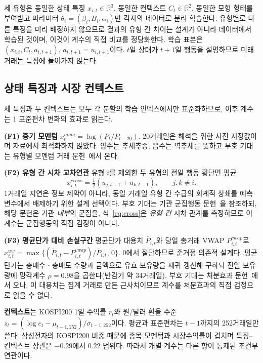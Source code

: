 세 유형은 동일한 상태 특징 $x_{i,t}\in\mathbb{R}^{3}$, 동일한 컨텍스트
$C_t\in\mathbb{R}^{2}$, 동일한 모형 형태를 부여받고 파라미터
$\theta_i=(\beta_i,B_i,\alpha_i)$만 각자의 데이터로 분리 학습한다. 유형별로 다른 특징을
미리 배정하지 않으므로 결과의 유형 간 차이는 설계가 아니라 데이터에서 학습된 것이며,
이것이 계수의 직접 비교를 정당화한다. 학습 표본은 $(x_{i,t},C_t,a_{i,t+1})$,
$a_{i,t+1}=u_{i,t+1}$이다. $t$일 상태가 $t+1$일 행동을 설명하므로 미래 거래는 특징에
들어가지 않는다.

\subsection{상태 특징과 시장 컨텍스트}
\label{sec:features}

세 특징과 두 컨텍스트는 모두 각 분할의 학습 인덱스에서만 표준화하므로, 이후 계수는 1
표준편차 변화의 효과로 읽는다.

\textbf{(F1) 중기 모멘텀} $x^{mom}_{t}=\log(P_t/P_{t-20})$. 20거래일은 해석을 위한 사전
지정값이며 자료에서 최적화하지 않았다. 양수는 추세추종, 음수는 역추세를 뜻하고 부호
기대는 유형별 모멘텀 거래
문헌~\cite{grinblatt2000investment,choe1999foreign}에서 온다.

\textbf{(F2) 유형 간 시차 교차연관} 유형 $i$를 제외한 두 유형의 전일 행동 횡단면 평균
\begin{equation}
x^{cross}_{i,t}=\tfrac{1}{2}\left(u_{j,t-1}+u_{k,t-1}\right),\qquad j,k\neq i.
\label{eq:cross}
\end{equation}
1거래일 지연은 정보 제약이 아니라, 동일 거래일 유형 간 수급의 회계적 상쇄를 예측
변수에서 배제하기 위한 설계 선택이다. 부호 기대는 기관 군집행동
문헌~\cite{lakonishok1992impact}을 참조하되, 해당 문헌은 기관 \emph{내부}의 군집을,
식~\eqref{eq:cross}은 \emph{유형 간} 시차 관계를 측정하므로 이 계수는 군집행동의 직접
검정이 아니다.

\textbf{(F3) 평균단가 대비 손실구간} 평균단가 대용치 $\bar P_{i,t}$와 당일 총거래 VWAP
$P^{vwap}_{i,t}$로 $x^{uw}_{i,t}=\max\{(\bar P_{i,t}-P^{vwap}_{i,t})/\bar P_{i,t},\,0\}$.
0에서 절단하므로 준거점 의존적 설계다. 평균단가는 총매수ㆍ총매도 수량과 금액으로 유효
보유량을 재귀 갱신해 구하되 전일 보유량에 망각계수 $\rho=0.98$을 곱한다(반감기 약
34거래일). 부호 기대는 처분효과
문헌~\cite{shefrin1985disposition,odean1998investors}에서 오나, 이 대용치는 집계 거래로
만든 근사치이므로 계수를 처분효과의 직접 검정으로 읽을 수 없다.

\textbf{컨텍스트}는 KOSPI200 1일 수익률 $r_t$와 원/달러 환율 수준
$z_t=(\log e_t-\mu_{t-1,252})/\sigma_{t-1,252}$이다. 평균과 표준편차는 $t-1$까지의
252거래일만 쓴다. 삼성전자의 KOSPI200 비중 때문에 종목 모멘텀과 시장수익률이 겹치며
특징--컨텍스트 상관은 $-0.29$에서 $0.22$ 범위다. 따라서 개별 계수는 다른 항이 통제된
조건부 연관이다.


